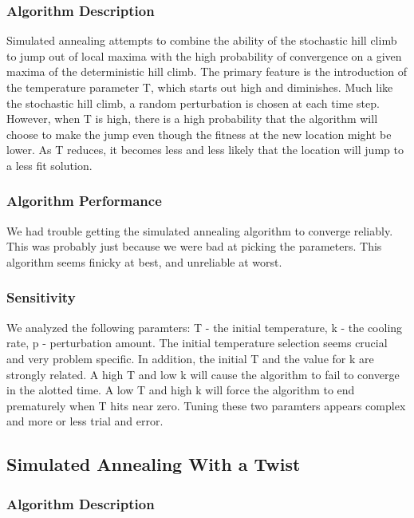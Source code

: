 \subsubsection{Algorithm Description}

Simulated annealing attempts to combine the ability of the stochastic hill climb to jump out of local maxima with the high probability of convergence on a given maxima of the deterministic hill climb. The primary feature is the introduction of the temperature parameter T, which starts out high and diminishes. Much like the stochastic hill climb, a random perturbation is chosen at each time step. However, when T is high, there is a high probability that the algorithm will choose to make the jump even though the fitness at the new location might be lower. As T reduces, it becomes less and less likely that the location will jump to a less fit solution.

\subsubsection{Algorithm Performance}

We had trouble getting the simulated annealing algorithm to converge reliably. This was probably just because we were bad at picking the parameters. This algorithm seems finicky at best, and unreliable at worst.

\subsubsection{Sensitivity}

We analyzed the following paramters: T - the initial temperature, k - the cooling rate, p - perturbation amount. The initial temperature selection seems crucial and very problem specific. In addition, the initial T and the value for k are strongly related. A high T and low k will cause the algorithm to fail to converge in the alotted time. A low T and high k will force the algorithm to end prematurely when T hits near zero. Tuning these two paramters appears complex and more or less trial and error.

\subsection{Simulated Annealing With a Twist}

\subsubsection{Algorithm Description}

